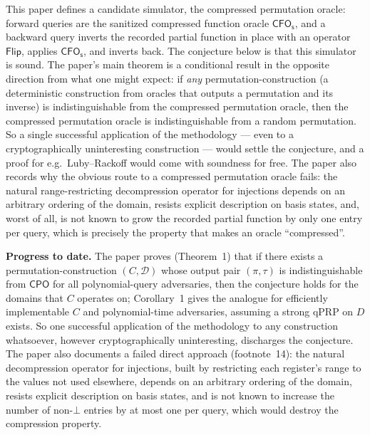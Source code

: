 \documentclass{aicr-conjecture}
\newcommand{\CFOs}{\mathsf{CFO_s}}
\newcommand{\Flip}{\mathsf{Flip}}
\newcommand{\CPO}{\mathsf{CPO}}
\begin{document}
This paper defines a candidate simulator, the compressed permutation
oracle: forward queries are the sanitized compressed function oracle
$\CFOs$, and a backward query inverts the recorded partial function in
place with an operator $\Flip$, applies $\CFOs$, and inverts back. The
conjecture below is that this simulator is sound. The paper's main
theorem is a conditional result in the opposite direction from what one
might expect: if \emph{any} permutation-construction (a deterministic
construction from oracles that outputs a permutation and its inverse)
is indistinguishable from the compressed permutation oracle, then the
compressed permutation oracle is indistinguishable from a random
permutation. So a single successful application of the methodology ---
even to a cryptographically uninteresting construction --- would settle
the conjecture, and a proof for e.g.\ Luby--Rackoff would come with
soundness for free. The paper also records why the obvious route to a
compressed permutation oracle fails: the natural range-restricting
decompression operator for injections depends on an arbitrary ordering
of the domain, resists explicit description on basis states, and, worst
of all, is not known to grow the recorded partial function by only one
entry per query, which is precisely the property that makes an oracle
``compressed''.

\textbf{Progress to date.} The paper proves (Theorem~1) that if there
exists a permutation-construction $(C,\mathcal{D})$ whose output pair
$(\pi,\tau)$ is indistinguishable from $\CPO$ for all polynomial-query
adversaries, then the conjecture holds for the domains that $C$
operates on; Corollary~1 gives the analogue for efficiently
implementable $C$ and polynomial-time adversaries, assuming a strong
qPRP on $D$ exists. So one successful application of the methodology to
any construction whatsoever, however cryptographically uninteresting,
discharges the conjecture. The paper also documents a failed direct
approach (footnote~14): the natural decompression operator for
injections, built by restricting each register's range to the values
not used elsewhere, depends on an arbitrary ordering of the domain,
resists explicit description on basis states, and is not known to
increase the number of non-$\bot$ entries by at most one per query,
which would destroy the compression property.
\end{document}
